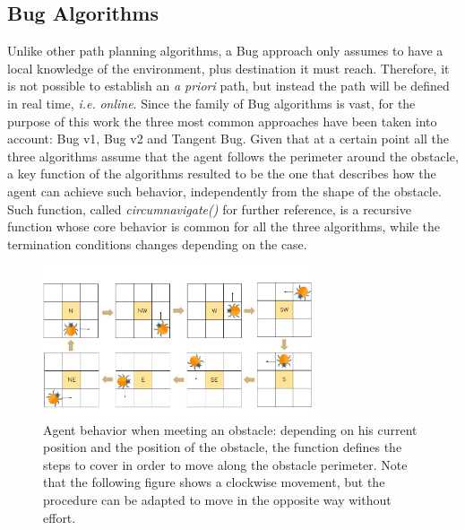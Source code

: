 \documentclass[conference]{IEEEtran}
\begin{document}
\subsection{Bug Algorithms}
Unlike other path planning algorithms, a Bug approach only assumes to have a local knowledge of the environment, plus destination it must reach. Therefore, it is not possible to establish an \emph{a priori} path, but instead the path will be defined in real time, \emph{i.e.} \emph{online}. Since the family of Bug algorithms is vast, for the purpose of this work the three most common approaches have been taken into account: Bug v1, Bug v2 and Tangent Bug.
Given that at a certain point all the three algorithms assume that the agent follows the perimeter around the obstacle, a key function of the algorithms resulted to be the one that describes how the agent can achieve such behavior, independently from the shape of the obstacle. Such function, called \emph{circumnavigate()} for further reference, is a recursive function whose core behavior is common for all the three algorithms, while the termination conditions changes depending on the case.

\begin{figure}[]
	\includegraphics[width=8cm]{circumnavigate.jpg}
	\centering
	\caption{Agent behavior when meeting an obstacle: depending on his current position and the position of the obstacle, the function defines the steps to cover in order to move along the obstacle perimeter. Note that the following figure shows a clockwise movement, but the procedure can be adapted to move in the opposite way without effort. }
	\label{fig:circumnavigate}
\end{figure}
\end{document}

